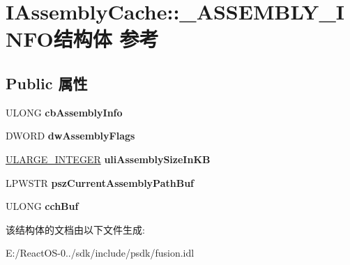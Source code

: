\hypertarget{struct_i_assembly_cache_1_1___a_s_s_e_m_b_l_y___i_n_f_o}{}\section{I\+Assembly\+Cache\+:\+:\+\_\+\+A\+S\+S\+E\+M\+B\+L\+Y\+\_\+\+I\+N\+F\+O结构体 参考}
\label{struct_i_assembly_cache_1_1___a_s_s_e_m_b_l_y___i_n_f_o}
\subsection*{Public 属性}
\begin{DoxyCompactItemize}
\item 
\mbox{\label{struct_i_assembly_cache_1_1___a_s_s_e_m_b_l_y___i_n_f_o_a3e856922b8e42bdd6302cc2e894bb7b0}} 
U\+L\+O\+NG {\bfseries cb\+Assembly\+Info}
\item 
\mbox{\label{struct_i_assembly_cache_1_1___a_s_s_e_m_b_l_y___i_n_f_o_a7d8251e2abaec91dbc7d5d72c4d8ec80}} 
D\+W\+O\+RD {\bfseries dw\+Assembly\+Flags}
\item 
\mbox{\label{struct_i_assembly_cache_1_1___a_s_s_e_m_b_l_y___i_n_f_o_ac047517f33e57629b4388acb52ec4601}} 
\hyperlink{struct___u_l_a_r_g_e___i_n_t_e_g_e_r}{U\+L\+A\+R\+G\+E\+\_\+\+I\+N\+T\+E\+G\+ER} {\bfseries uli\+Assembly\+Size\+In\+KB}
\item 
\mbox{\label{struct_i_assembly_cache_1_1___a_s_s_e_m_b_l_y___i_n_f_o_af08eee7e7b6455faa84018e5e2f940ec}} 
L\+P\+W\+S\+TR {\bfseries psz\+Current\+Assembly\+Path\+Buf}
\item 
\mbox{\label{struct_i_assembly_cache_1_1___a_s_s_e_m_b_l_y___i_n_f_o_aa62832a8f18d2fe4e5386424eb977c9f}} 
U\+L\+O\+NG {\bfseries cch\+Buf}
\end{DoxyCompactItemize}


该结构体的文档由以下文件生成\+:\begin{DoxyCompactItemize}
\item 
E\+:/\+React\+O\+S-\/0../sdk/include/psdk/fusion.\+idl\end{DoxyCompactItemize}

